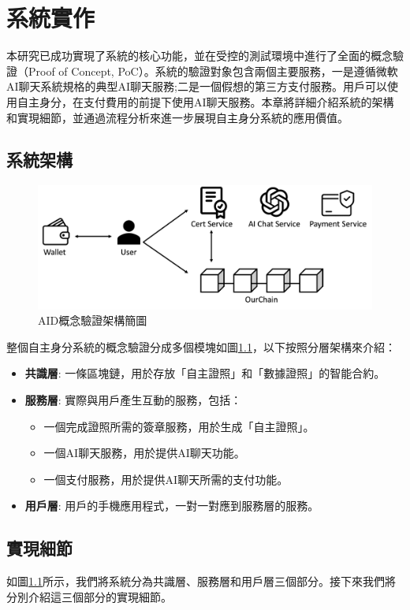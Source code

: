 
\chapter{系統實作}
本研究已成功實現了系統的核心功能，並在受控的測試環境中進行了全面的概念驗證（Proof of Concept, PoC）。系統的驗證對象包含兩個主要服務，一是遵循微軟AI聊天系統規格\cite{microsoft_ai_chat_protocol}的典型AI聊天服務;二是一個假想的第三方支付服務。用戶可以使用自主身分，在支付費用的前提下使用AI聊天服務。本章將詳細介紹系統的架構和實現細節，並通過流程分析來進一步展現自主身分系統的應用價值。
\section{系統架構}
\begin{figure}
  \centering
  \includegraphics[width=\linewidth, keepaspectratio]{figures/implement.png}
  \caption{AID概念驗證架構簡圖}
  \label{fig:implement}
\end{figure}
整個自主身分系統的概念驗證分成多個模塊如圖\ref{fig:implement}，以下按照分層架構來介紹：
\begin{itemize}
  \item \textbf{共識層}: 一條區塊鏈，用於存放「自主證照」和「數據證照」的智能合約。
  \item \textbf{服務層}: 實際與用戶產生互動的服務，包括：
        \begin{itemize}
          \item 一個完成證照所需的簽章服務，用於生成「自主證照」。
          \item 一個AI聊天服務，用於提供AI聊天功能。
          \item 一個支付服務，用於提供AI聊天所需的支付功能。
        \end{itemize}
  \item \textbf{用戶層}: 用戶的手機應用程式，一對一對應到服務層的服務。
\end{itemize}
\section{實現細節}
如圖\ref{fig:implement}所示，我們將系統分為共識層、服務層和用戶層三個部分。接下來我們將分別介紹這三個部分的實現細節。

